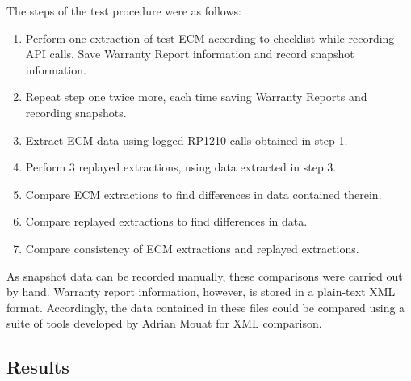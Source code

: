 The steps of the test procedure were as follows:

\begin{enumerate}
  \item Perform one extraction of test ECM according to checklist while recording API calls. Save Warranty Report information and record snapshot information.
  \item Repeat step one twice more, each time saving Warranty Reports and recording snapshots.
  \item Extract ECM data using logged RP1210 calls obtained in step 1.
  \item Perform 3 replayed extractions, using data extracted in step 3.
  \item Compare ECM extractions to find differences in data contained therein.
  \item Compare replayed extractions to find differences in data.
  \item Compare consistency of ECM extractions and replayed extractions.
\end{enumerate}

As snapshot data can be recorded manually, these comparisons were carried out by hand. Warranty report information, however,
is stored in a plain-text XML format. Accordingly, the data contained in these files could be compared using a suite of tools developed
by Adrian Mouat\cite{Mouat2002} for XML comparison.

\subsection{Results}

